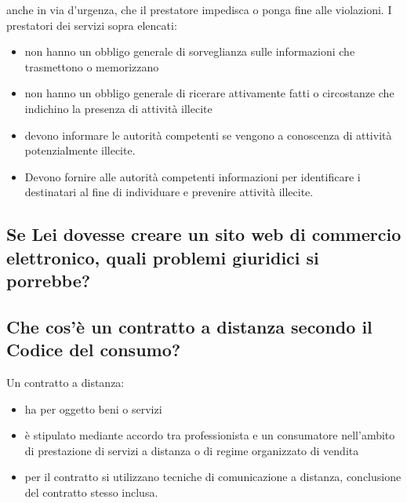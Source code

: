 anche in via d'urgenza, che il prestatore impedisca o ponga fine alle violazioni.
\newline
I prestatori dei servizi sopra elencati:
\begin{itemize}
    \item non hanno un obbligo generale di sorveglianza sulle informazioni che trasmettono o memorizzano
    \item non hanno un obbligo generale di ricerare attivamente fatti o circostanze che
        indichino la presenza di attività illecite
    \item devono informare le autorità competenti se vengono a conoscenza di attività
        potenzialmente illecite.
    \item Devono fornire alle autorità competenti informazioni per identificare i
        destinatari al fine di individuare e prevenire attività illecite.
\end{itemize}

\subsection{Se Lei dovesse creare un sito web di commercio elettronico, quali problemi giuridici si porrebbe?}

\subsection{Che cos’è un contratto a distanza secondo il Codice del consumo?}
Un contratto a distanza:
\begin{itemize}
    \item ha per oggetto beni o servizi
    \item è stipulato mediante accordo tra professionista e un consumatore nell'ambito di
        prestazione di servizi a distanza o di regime organizzato di vendita
    \item per il contratto si utilizzano tecniche di comunicazione a distanza, conclusione
        del contratto stesso inclusa.
\end{itemize}

